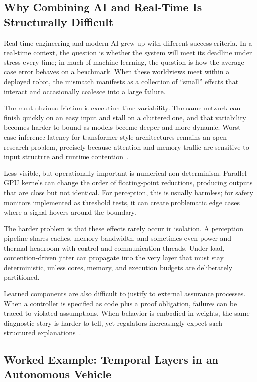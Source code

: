 \documentclass[smallextended]{svjour3}
\begin{document}
\subsection{Why Combining AI and Real-Time Is Structurally Difficult}
\label{subsec:ai-rt-challenge}

Real-time engineering and modern AI grew up with different success criteria. In a real-time context, the question is whether the system will meet its deadline under stress every time; in much of machine learning, the question is how the average-case error behaves on a benchmark. When these worldviews meet within a deployed robot, the mismatch manifests as a collection of ``small'' effects that interact and occasionally coalesce into a large failure.

The most obvious friction is execution-time variability. The same network can finish quickly on an easy input and stall on a cluttered one, and that variability becomes harder to bound as models become deeper and more dynamic. Worst-case inference latency for transformer-style architectures remains an open research problem, precisely because attention and memory traffic are sensitive to input structure and runtime contention~\cite{amalou2023cawet,biondi2021timepredictable}.

Less visible, but operationally important is numerical non-determinism. Parallel GPU kernels can change the order of floating-point reductions, producing outputs that are close but not identical. For perception, this is usually harmless; for safety monitors implemented as threshold tests, it can create problematic edge cases where a signal hovers around the boundary.

The harder problem is that these effects rarely occur in isolation. A perception pipeline shares caches, memory bandwidth, and sometimes even power and thermal headroom with control and communication threads. Under load, contention-driven jitter can propagate into the very layer that must stay deterministic, unless cores, memory, and execution budgets are deliberately partitioned.

Learned components are also difficult to justify to external assurance processes. When a controller is specified as code plus a proof obligation, failures can be traced to violated assumptions. When behavior is embodied in weights, the same diagnostic story is harder to tell, yet regulators increasingly expect such structured explanations~\cite{brunke2022,seshia2022}.

\subsection{Worked Example: Temporal Layers in an Autonomous Vehicle}
\label{subsec:av-example}
\end{document}
